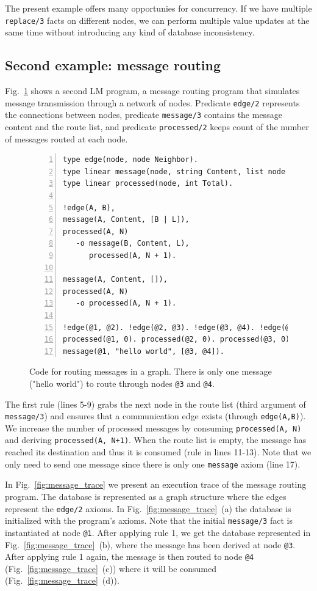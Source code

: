 The present example offers many opportunies for concurrency. If we have multiple
\texttt{replace/3} facts on different nodes, we can perform multiple value
updates at the same time without introducing any kind of database inconsistency.

\subsection{Second example: message routing}

Fig.~\ref{code:message} shows a second LM program, a message routing program
that simulates message transmission through a network of nodes.  Predicate
\texttt{edge/2} represents the connections between nodes, predicate
\texttt{message/3} contains the message content and the route list, and
predicate \texttt{processed/2} keeps count of the number of messages routed at
each node.

\begin{figure}[h!]
\scriptsize\begin{Verbatim}[numbers=left]
type edge(node, node Neighbor).
type linear message(node, string Content, list node Routing).
type linear processed(node, int Total).

!edge(A, B),
message(A, Content, [B | L]),
processed(A, N)
   -o message(B, Content, L),
      processed(A, N + 1).

message(A, Content, []),
processed(A, N)
   -o processed(A, N + 1).

!edge(@1, @2). !edge(@2, @3). !edge(@3, @4). !edge(@1, @3).
processed(@1, 0). processed(@2, 0). processed(@3, 0). processed(@4, 0).
message(@1, "hello world", [@3, @4]).
\end{Verbatim}
\caption{Code for routing messages in a graph. There is only one message ("hello
world") to route through nodes \texttt{@3} and \texttt{@4}.}
\label{code:message}
\end{figure}

The first rule (lines 5-9) grabs the next node in the route list (third argument
of \texttt{message/3}) and ensures that a communication edge exists
(through \texttt{edge(A,B)}). We increase the number of processed messages by
consuming \texttt{processed(A,~N)} and deriving \texttt{processed(A,~N+1)}.
When the route list is empty, the message has reached its destination and thus
it is consumed (rule in lines 11-13).  Note that we only need to send one
message since there is only one \texttt{message} axiom (line 17).

In Fig.~\ref{fig:message_trace} we present an execution trace of the message
routing program.  The database is represented as a graph structure where the
edges represent the \texttt{edge/2} axioms. In Fig.~\ref{fig:message_trace}~(a)
the database is initialized with the program's axioms.  Note that the initial
\texttt{message/3} fact is instantiated at node \texttt{@1}. After applying rule 1,
we get the database represented in Fig.~\ref{fig:message_trace}~(b), where
the message has been derived at node \texttt{@3}. After applying rule 1
again, the message is then routed to node \texttt{@4}
(Fig.~\ref{fig:message_trace}~(c)) where it will be consumed
(Fig.~\ref{fig:message_trace}~(d)).

